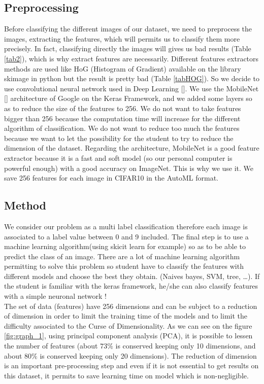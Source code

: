 \documentclass[10pt, a4paper, twocolumn]{article} %
\begin{document}
\subsection{Preprocessing}
Before classifying the different images of our dataset, we need to preprocess the images, extracting the features, which will permits us to classify them more precisely. In fact, classifying directly the images will gives us bad results (Table \ref{tab2}), which is why extract features are necessarily.  Different features extractors methods are used like HoG (Histogram of Gradient) available on the library skimage in python but the result is pretty bad (Table \ref{tabHOG}). So we decide to use convolutional neural network used in Deep Learning [\cite{2}].  We use the MobileNet [\cite{3}] architecture of Google on the Keras Framework, and we added some layers so as to reduce the size of the features to 256. We do not want to take features bigger than 256 because the computation time will increase for the different algorithm of classification. We do not want to reduce too much the features because we want to let the possibility for the student to try to reduce the dimension of the dataset.  Regarding the architecture, MobileNet is a good feature extractor because it is a fast and soft model (so our personal computer is powerful enough) with a good accuracy on ImageNet. This is why we use it. We save 256 features for each image in CIFAR10 in the AutoML format. 

\subsection{Method}
We consider our problem as a multi label classification therefore each image is associated to a label value between 0 and 9 included. The final step is to use a machine learning algorithm(using skicit learn for example) so as to be able to predict the class of an image. There are a lot of machine learning algorithm permitting to solve this problem so student have to classify the features with different models and choose the best they obtain. (Naives bayes, SVM, tree, …).
If the student is familiar with the keras framework, he/she can also classify features with a simple neuronal network ! \\The set of data (features) have 256 dimensions and can be subject to a reduction of dimension in order to limit the training time of the models and to limit the difficulty associated to the Curse of Dimensionality. As we can see on the figure \ref{fig:graph_1}, using  principal component analysis (PCA), it is possible to lessen the number of features (about $73\%$ is conserved keeping only 10 dimensions, and about $80\%$ is conserved keeping only 20 dimensions). The reduction of dimension is an important pre-processing step and even if it is not essential to get
results on this dataset, it permits to save learning time on model which is non-negligible.\\
\end{document}
